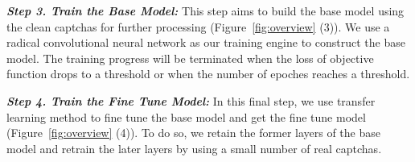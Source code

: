 \noindent \textbf{\emph{Step 3. Train the Base Model:}}
This step aims to build the base model using the clean captchas for further processing (Figure~\ref{fig:overview} (3)). We use a radical convolutional neural network as our training engine to construct the base model. The training progress will be terminated when the loss of objective function drops to a threshold or when the number of epoches reaches a threshold.

\noindent \textbf{\emph{Step 4. Train the Fine Tune Model:}}
In this final step, we use transfer learning method to fine tune the base model and get the fine tune model (Figure~\ref{fig:overview} (4)). To do so, we retain the former layers of the base model and retrain the later layers by using a small number of real captchas.








